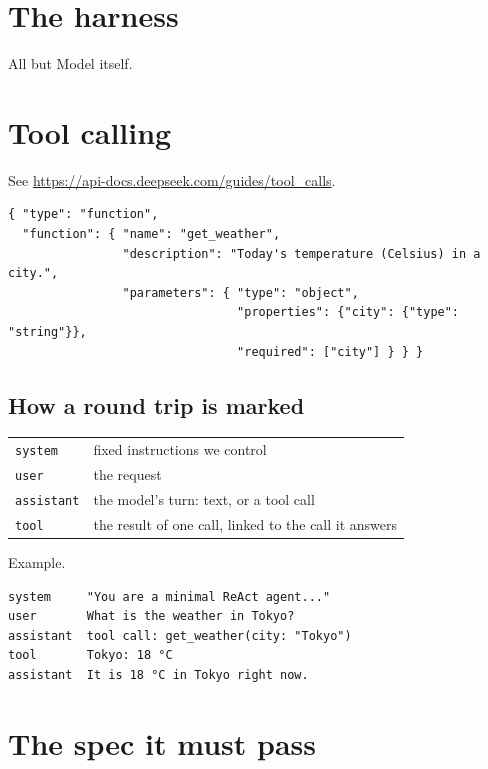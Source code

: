 \documentclass[12pt]{ctexart}
\begin{document}
\section{The harness}

All but Model itself.

\section{Tool calling}

See \url{https://api-docs.deepseek.com/guides/tool_calls}.

\begin{verbatim}
{ "type": "function",
  "function": { "name": "get_weather",
                "description": "Today's temperature (Celsius) in a city.",
                "parameters": { "type": "object",
                                "properties": {"city": {"type": "string"}},
                                "required": ["city"] } } }
\end{verbatim}

\subsection{How a round trip is marked}

\begin{center}
\begin{tabular}{@{}l@{\quad}l@{}}
  \texttt{system} & fixed instructions we control \\
  \texttt{user} & the request \\
  \texttt{assistant} & the model's turn: text, or a tool call \\
  \texttt{tool} & the result of one call, linked to the call it answers \\
\end{tabular}
\end{center}

Example.

\begin{verbatim}
system     "You are a minimal ReAct agent..."
user       What is the weather in Tokyo?
assistant  tool call: get_weather(city: "Tokyo")
tool       Tokyo: 18 °C
assistant  It is 18 °C in Tokyo right now.
\end{verbatim}

\section{The spec it must pass}
\end{document}
